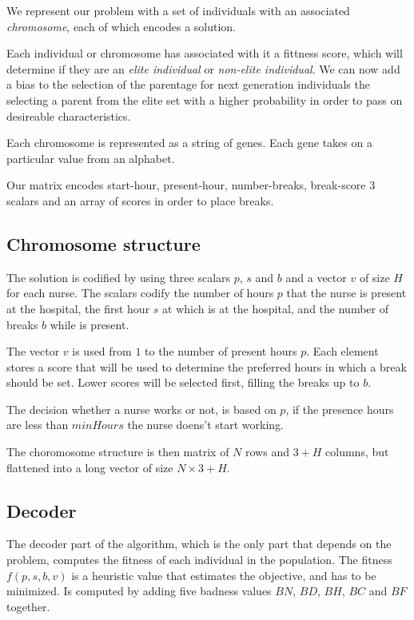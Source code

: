 \documentclass[12pt,a4paper]{article}
\begin{document}
We represent our problem with a set of individuals with an associated
\textit{chromosome}, each of which encodes a solution.

Each individual or chromosome has associated with it a fittness score, which
will determine if they are an \textit{elite individual} or \textit{non-elite
individual}. We can now add a bias to the selection of the parentage for next
generation individuals the selecting a parent from the elite set with a higher
probability in order to pass on desireable characteristics.

Each chromosome is represented as a string of genes. Each gene takes on a
particular value from an alphabet.

Our matrix encodes start-hour, present-hour, number-breaks, break-score
3 scalars and an array of scores in order to place breaks.


\subsection{Chromosome structure}

The solution is codified by using three scalars $p$, $s$ and $b$ and a vector
$v$ of size $H$ for each nurse. The scalars codify the number of hours $p$ that
the nurse is present at the hospital, the first hour $s$ at which is at the
hospital, and the number of breaks $b$ while is present.

The vector $v$ is used from $1$ to the number of present hours $p$. Each element
stores a score that will be used to determine the preferred hours in which a
break should be set. Lower scores will be selected first, filling the breaks up
to $b$.

The decision whether a nurse works or not, is based on $p$, if the presence
hours are less than $minHours$ the nurse doens't start working.

The choromosome structure is then matrix of $N$ rows and $3+H$ columns, but
flattened into a long vector of size $N \times 3+H$.

\subsection{Decoder}

The decoder part of the algorithm, which is the only part that depends on the
problem, computes the fitness of each individual in the population. The fitness
$f(p,s,b,v)$ is a heuristic value that estimates the objective, and has to be
minimized. Is computed by adding five badness values $BN$, $BD$, $BH$, $BC$ and
$BF$ together.
\end{document}
